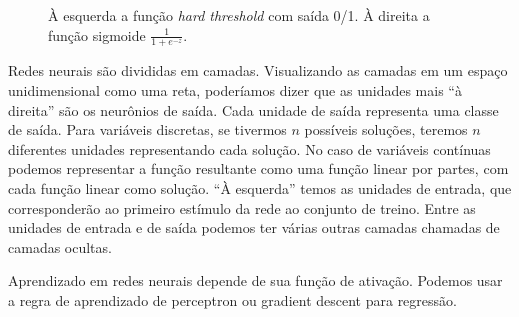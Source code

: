 \documentclass[a4paper,10pt]{article}
\theoremstyle{plain}
\begin{document}
\begin{figure}[h]
  \caption{À esquerda a função \textit{hard threshold} com saída 0/1. À direita a função sigmoide
    $\frac{1}{1+e^{-z}}$.}
\end{figure}

Redes neurais são divididas em camadas. Visualizando as camadas em um espaço unidimensional como
uma reta, poderíamos dizer que as unidades mais ``à direita'' são os neurônios de saída. Cada
unidade de saída representa uma classe de saída. Para variáveis discretas, se tivermos $n$
possíveis soluções, teremos $n$ diferentes unidades representando cada solução. No caso de
variáveis contínuas podemos representar a função resultante como uma função linear por partes, com
cada função linear como solução. ``À esquerda'' temos as unidades de entrada, que corresponderão
ao primeiro estímulo da rede ao conjunto de treino. Entre as unidades de entrada e de saída podemos
ter várias outras camadas chamadas de camadas ocultas.

Aprendizado em redes neurais depende de sua função de ativação. Podemos usar a regra de aprendizado
de perceptron ou gradient descent para regressão.
\end{document}
